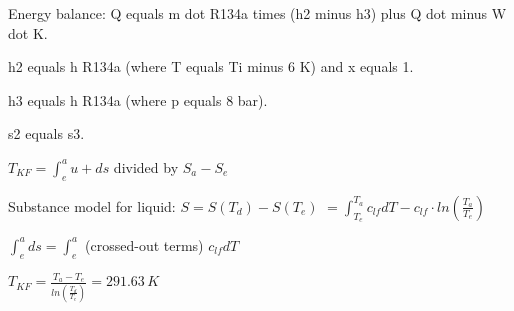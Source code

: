 Energy balance:  
Q equals m dot R134a times (h2 minus h3) plus Q dot minus W dot K.  

h2 equals h R134a (where T equals Ti minus 6 K) and x equals 1.  

h3 equals h R134a (where p equals 8 bar).  

s2 equals s3.

\( T_{KF} = \int_{e}^{a} u + ds \) divided by \( S_{a} - S_{e} \)  

Substance model for liquid:  
\( S = S(T_{d}) - S(T_{e}) \)  
\( = \int_{T_{e}}^{T_{a}} c_{lf} dT - c_{lf} \cdot ln \left( \frac{T_{a}}{T_{e}} \right) \)  

\( \int_{e}^{a} ds = \int_{e}^{a} \) (crossed-out terms) \( c_{lf} dT \)  

\( T_{KF} = \frac{T_{a} - T_{e}}{ln \left( \frac{T_{d}}{T_{e}} \right)} = 291.63 \, K \)